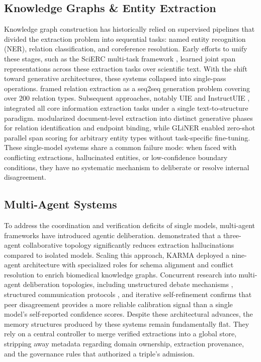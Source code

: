 \documentclass{article}
\begin{document}
\subsection{Knowledge Graphs \& Entity Extraction}
Knowledge graph construction has historically relied on supervised pipelines that
divided the extraction problem into sequential tasks: named entity recognition
(NER), relation classification, and coreference resolution. Early efforts to
unify these stages, such as the SciERC multi-task framework
\citep{luan2018multitask}, learned joint span representations across these
extraction tasks over scientific text. With the shift toward generative
architectures, these systems collapsed into single-pass operations.
\citet{cabot2021rebel} framed relation extraction as a seq2seq generation
problem covering over 200 relation types. Subsequent approaches, notably UIE
\citep{lu2022uie} and InstructUIE \citep{wang2023instructuie}, integrated all
core information extraction tasks under a single text-to-structure paradigm.
\citet{xue2024autore} modularized document-level extraction into distinct
generative phases for relation identification and endpoint binding, while
GLiNER \citep{zaratiana2024gliner} enabled zero-shot parallel span scoring for
arbitrary entity types without task-specific fine-tuning. These single-model
systems share a common failure mode: when faced with conflicting extractions,
hallucinated entities, or low-confidence boundary conditions, they have no
systematic mechanism to deliberate or resolve internal disagreement.

\subsection{Multi-Agent Systems}
To address the coordination and verification deficits of single models,
multi-agent frameworks have introduced agentic deliberation.
\citet{ye2024cooperkgc} demonstrated that a three-agent collaborative topology
significantly reduces extraction hallucinations compared to isolated models.
Scaling this approach, KARMA \citep{lu2025karma} deployed a nine-agent
architecture with specialized roles for schema alignment and conflict resolution
to enrich biomedical knowledge graphs. Concurrent research into multi-agent
deliberation topologies, including unstructured debate mechanisms \citep{du2024debate}, structured 
communication protocols \citep{chan2024chateval}, and iterative self-refinement 
\citep{madaan2023selfrefine} confirms that peer disagreement provides a more
reliable calibration signal than a single model's self-reported confidence
scores. Despite these architectural advances, the memory structures produced by
these systems remain fundamentally flat. They rely on a central controller to
merge verified extractions into a global store, stripping away metadata
regarding domain ownership, extraction provenance, and the governance rules
that authorized a triple's admission.
\end{document}
